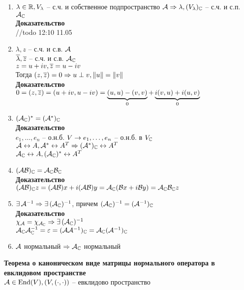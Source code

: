 \documentclass[12pt]{article}
\begin{document}
\begin{enumerate}
    \item $ \lambda \in \Rset, V_ \lambda$ -- с.ч. и собственное подпространство $\mcA \Rto \lambda, (V_ \lambda)_\Cset$ -- с.ч. и с.п. $\mcA_\Cset$\\
        \textbf{Доказательство}\\
        //todo 12:10 11.05
    \item $ \lambda, z$ -- с.ч. и с.в. $\mcA$\\
        $\ol \lambda, \ol z$ -- с.ч. и с.в. $\mcA_\Cset$\\
        $z = u + iv, \ol z = u - iv$\\
        Тогда $(z, \ol z) = 0 \Rto u \perp v, \|u\| = \|v\|$\\
        \textbf{Доказательство}\\
        $0 = (z, \ol z) = (u + iv, u - iv) = \ub 0{(u,u) - (v,v)} + \ub{0}{i(v,u) + i(u, v)}$
    \item $(\mcA_\Cset)^* = (\mcA^*)_\Cset$\\
        \textbf{Доказательство}\\
        $e_1, \ldots, e_n$ -- о.н.б. $V \rto e_1, \ldots, e_n$ -- о.н.б. в $V_\Cset$\\
        $\mcA \lrto A, \mcA^* \lrto A^T \Rto (\mcA^*)_\Cset \lrto A^T$\\
        $\mcA_\Cset \lrto A, (\mcA_\Cset)^* \lrto A^T$
    \item $(\mcA \mcB)_\Cset = \mcA_\Cset \mcB_\Cset$\\
        \textbf{Доказательство}\\
        $(\mcA\mcB)_\Cset z = (\mcA\mcB) x + i (\mcA\mcB)y = \mcA_\Cset (\mcB x + i\mcB y) = \mcA_\Cset \mcB_\Cset z$
    \item $\ex \mcA^{-1} \Rto \ex(\mcA_\Cset)^{-1}$, причем $(\mcA_\Cset)^{-1} = (\mcA^{-1})_\Cset$\\
        \textbf{Доказательство}\\
        $\chi_\mcA = \chi_{\mcA_\Cset} \Rto \ex (\mcA_\Cset)^{-1}$\\
        $\mcA_\Cset \mcA_\Cset^{-1} = \eps = (\mcA \mcA^{-1})_\Cset = \mcA_\Cset (\mcA^{-1})_\Cset$
    \item $\mcA$ нормальный $\Rto \mcA_\Cset$ нормальный
\end{enumerate}
\textbf{Теорема о каноническом виде матрицы нормального оператора в евклидовом пространстве}\\
$\mcA \in \nm{End}(V), (V, (\cdot, \cdot))$ -- евклидово пространство\\
\end{document}
